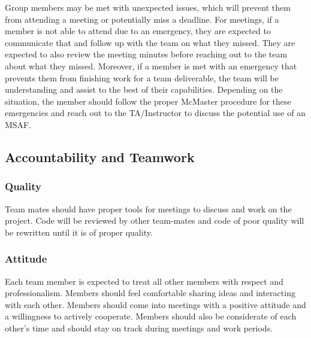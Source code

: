 \documentclass{article}
\begin{document}

Group members may be met with unexpected issues, which will prevent them 
from attending a meeting or potentially miss a deadline. For meetings, 
if a member is not able to attend due to an emergency, they are expected 
to communicate that and follow up with the team on what they missed. 
They are expected to also review the meeting minutes before reaching 
out to the team about what they missed. Moreover, if a member is met 
with an emergency that prevents them from finishing work for a team 
deliverable, the team will be understanding and assist to the best 
of their capabilities. Depending on the situation, the member should 
follow the proper McMaster procedure for these emergencies and reach 
out to the TA/Instructor to discuss the potential use of an MSAF.

\subsection*{Accountability and Teamwork}

\subsubsection*{Quality} 

Team mates should have proper tools for meetings to discuss and work 
on the project.
Code will be reviewed by other team-mates and code of poor quality 
will be rewritten  until it is of proper quality.

\subsubsection*{Attitude}


Each team member is expected to treat all other members with respect and 
professionalism. Members should feel comfortable sharing ideas and 
interacting with each other. Members should come into meetings with a
 positive attitude and a willingness to actively cooperate. 
 Members should also be considerate of each other’s time and 
 should stay on track during meetings and work periods.\\
\end{document}
